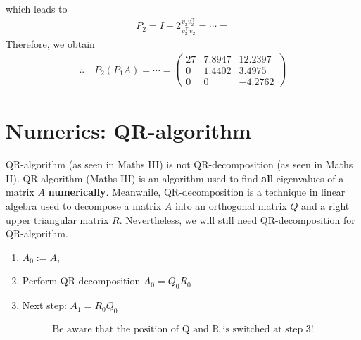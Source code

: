 \documentclass[12pt]{article}
\begin{document}
which leads to 
\begin{align}
	P_2 = I -2 \frac{v_2v_2^{\top}}{v_2^{\top}v_2} = \cdots = 
\end{align}
Therefore, we obtain
\begin{align}
	\therefore\quad
	\boxed{
		P_2(P_1A) 
		= \cdots 
		= \begin{pmatrix} 27 & 7.8947 & 12.2397 \\ 0 &1.4402 & 3.4975 \\ 0 &0 &-4.2762 \end{pmatrix}
	}
\end{align}
\clearpage
\section{Numerics: QR-algorithm}
\begin{observationboxed}
	QR-algorithm (as seen in Maths III) is not QR-decomposition (as seen in Maths II). 
	QR-algorithm (Maths III) is an algorithm used to find 
	\textbf{all} eigenvalues of a matrix $A$ \textbf{numerically}. Meanwhile, 
	QR-decomposition is a technique in linear algebra used to decompose 
	a matrix $A$ into an orthogonal matrix $Q$ and a right upper triangular matrix $R$.
	Nevertheless, we will still need QR-decomposition for QR-algorithm.
\end{observationboxed}
\begin{mdframed}
	\begin{enumerate}
		\item $A_0 := A$,
		\item Perform QR-decomposition $A_0 = Q_0R_0$
		\item Next step: $A_1 = R_0Q_0$
	\end{enumerate}
\end{mdframed}
\begin{align*}
	\boxed{
		\text{Be aware that the position of Q and R is switched at step 3!}
	}
\end{align*}

\clearpage
\end{document}
